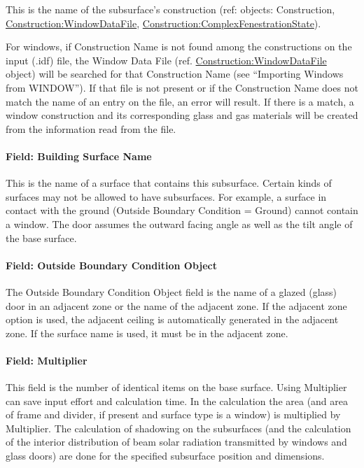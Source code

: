 This is the name of the subsurface's construction (ref: objects: Construction, \hyperref[constructionwindowdatafile]{Construction:WindowDataFile}, \hyperref[constructioncomplexfenestrationstate]{Construction:ComplexFenestrationState}).

For windows, if Construction Name is not found among the constructions on the input (.idf) file, the Window Data File (ref. \hyperref[constructionwindowdatafile]{Construction:WindowDataFile} object) will be searched for that Construction Name (see ``Importing Windows from WINDOW''). If that file is not present or if the Construction Name does not match the name of an entry on the file, an error will result. If there is a match, a window construction and its corresponding glass and gas materials will be created from the information read from the file.

\paragraph{Field: Building Surface Name}\label{field-building-surface-name-5}

This is the name of a surface that contains this subsurface. Certain kinds of surfaces may not be allowed to have subsurfaces. For example, a surface in contact with the ground (Outside Boundary Condition = Ground) cannot contain a window. The door assumes the outward facing angle as well as the tilt angle of the base surface.

\paragraph{Field: Outside Boundary Condition Object}\label{field-outside-boundary-condition-object-5}

The Outside Boundary Condition Object field is the name of a glazed (glass) door in an adjacent zone or the name of the adjacent zone. If the adjacent zone option is used, the adjacent ceiling is automatically generated in the adjacent zone. If the surface name is used, it must be in the adjacent zone.

\paragraph{Field: Multiplier}\label{field-multiplier-6}

This field is the number of identical items on the base surface. Using Multiplier can save input effort and calculation time. In the calculation the area (and area of frame and divider, if present and surface type is a window) is multiplied by Multiplier. The calculation of shadowing on the subsurfaces (and the calculation of the interior distribution of beam solar radiation transmitted by windows and glass doors) are done for the specified subsurface position and dimensions.

